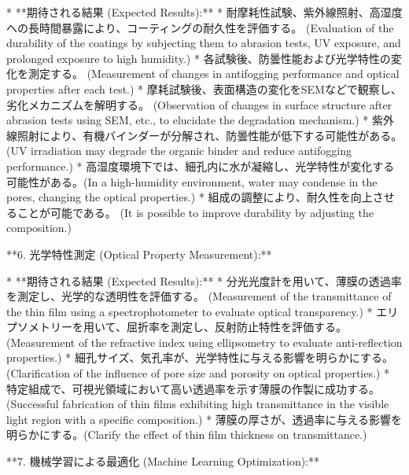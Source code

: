 \documentclass{article}
\begin{document}
*   **期待される結果 (Expected Results):**
    *   耐摩耗性試験、紫外線照射、高湿度への長時間暴露により、コーティングの耐久性を評価する。 (Evaluation of the durability of the coatings by subjecting them to abrasion tests, UV exposure, and prolonged exposure to high humidity.)
    *   各試験後、防曇性能および光学特性の変化を測定する。 (Measurement of changes in antifogging performance and optical properties after each test.)
    *   摩耗試験後、表面構造の変化をSEMなどで観察し、劣化メカニズムを解明する。 (Observation of changes in surface structure after abrasion tests using SEM, etc., to elucidate the degradation mechanism.)
    *   紫外線照射により、有機バインダーが分解され、防曇性能が低下する可能性がある。 (UV irradiation may degrade the organic binder and reduce antifogging performance.)
    *   高湿度環境下では、細孔内に水が凝縮し、光学特性が変化する可能性がある。(In a high-humidity environment, water may condense in the pores, changing the optical properties.)
    *   組成の調整により、耐久性を向上させることが可能である。 (It is possible to improve durability by adjusting the composition.)

**6. 光学特性測定 (Optical Property Measurement):**

*   **期待される結果 (Expected Results):**
    *   分光光度計を用いて、薄膜の透過率を測定し、光学的な透明性を評価する。 (Measurement of the transmittance of the thin film using a spectrophotometer to evaluate optical transparency.)
    *   エリプソメトリーを用いて、屈折率を測定し、反射防止特性を評価する。 (Measurement of the refractive index using ellipsometry to evaluate anti-reflection properties.)
    *   細孔サイズ、気孔率が、光学特性に与える影響を明らかにする。 (Clarification of the influence of pore size and porosity on optical properties.)
    *   特定組成で、可視光領域において高い透過率を示す薄膜の作製に成功する。 (Successful fabrication of thin films exhibiting high transmittance in the visible light region with a specific composition.)
    *   薄膜の厚さが、透過率に与える影響を明らかにする。(Clarify the effect of thin film thickness on transmittance.)

**7. 機械学習による最適化 (Machine Learning Optimization):**
\end{document}
